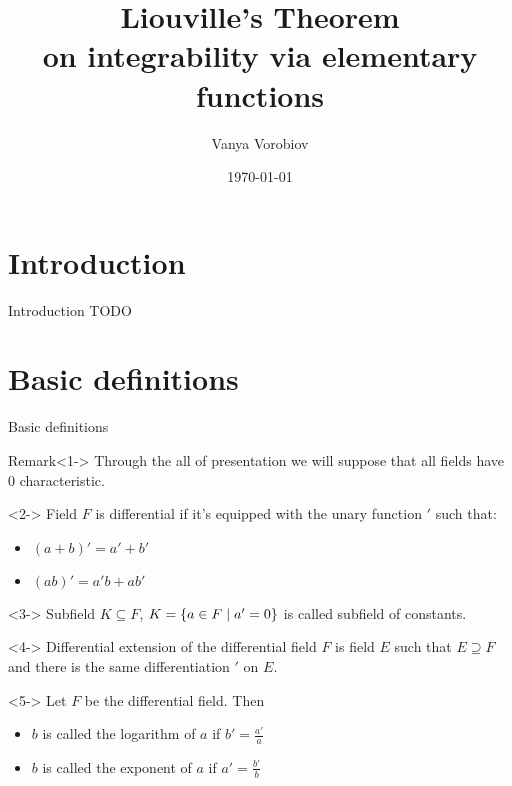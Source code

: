 \documentclass[8pt]{beamer}
\renewcommand{\|}{\ensuremath{\hspace{0.1cm} | \hspace{0.1cm}}}
\begin{document}
    \title[Liouville's Theorem]{Liouville's Theorem \\ on integrability via elementary functions}
    \author{Vanya Vorobiov}
    \date{\today}

    \begin{frame}
        \titlepage
    \end{frame}

    \section{Introduction}
    \begin{frame}{Introduction}
        TODO
    \end{frame}

    \section{Basic definitions}
    \begin{frame}{Basic definitions}
        \begin{block}{Remark}<1->
            Through the all of presentation we will suppose that all fields have 0 characteristic.
        \end{block}
        \begin{definition}<2->
            Field $F$ is differential if it's equipped with the unary function $'$ such that:
            \begin{itemize}
                \item $(a+b)' = a' + b'$
                \item $(ab)' = a'b + ab'$
            \end{itemize}
        \end{definition}
        \begin{definition}<3->
            Subfield $K \subseteq F$, $K = \{ a \in F \| a' = 0 \}$ is called subfield of constants.
        \end{definition}
        \begin{definition}<4->
            Differential extension of the differential field $F$ is field $E$ such that $E \supseteq F$ and there is the same differentiation $'$ on $E$.
        \end{definition}
        \begin{definition}<5->
            Let $F$ be the differential field. Then
            \begin{itemize}
                \item $b$ is called the logarithm of $a$ if $b' = \frac{a'}{a}$
                \item $b$ is called the exponent of $a$ if $a' = \frac{b'}{b}$
            \end{itemize}
        \end{definition}
    \end{frame}
    
\end{document}
